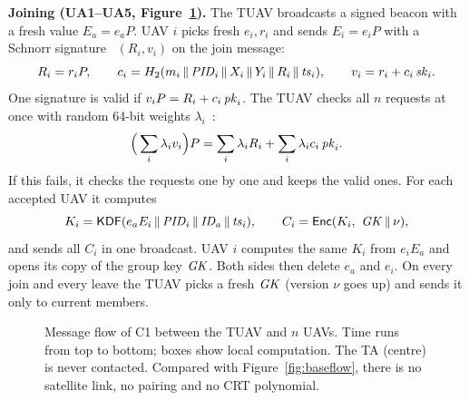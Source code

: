 \documentclass[11pt,openany]{report}
\begin{document}
\textbf{Joining (UA1--UA5, Figure~\ref{fig:c1flow}).} The TUAV broadcasts a signed beacon with a fresh value $E_a=e_aP$. UAV $i$ picks fresh $e_i,r_i$
and sends $E_i=e_iP$ with a Schnorr signature~\cite{schnorr} $(R_i,v_i)$ on the join message:
\[ R_i=r_iP,\qquad c_i=H_2(m_i\,\|\,\mathit{PID}_i\,\|\, X_i\,\|\, Y_i\,\|\, R_i\,\|\,\mathit{ts}_i),\qquad v_i=r_i+c_i\,\mathit{sk}_i . \]
One signature is valid if $v_iP=R_i+c_i\,\mathit{pk}_i$. The TUAV checks all $n$ requests at once with random 64-bit weights $\lambda_i$~\cite{bgr}:
\begin{equation}\label{eq:bv}
\Big(\sum_i\lambda_iv_i\Big)P=\sum_i\lambda_iR_i+\sum_i\lambda_ic_i\,\mathit{pk}_i .
\end{equation}
If this fails, it checks the requests one by one and keeps the valid ones. For each accepted UAV it computes
\[ K_i=\mathsf{KDF}(e_aE_i\,\|\,\mathit{PID}_i\,\|\,\mathit{ID}_a\,\|\,\mathit{ts}_i),\qquad C_i=\mathsf{Enc}(K_i,\ \mathit{GK}\,\|\,\nu), \]
and sends all $C_i$ in one broadcast. UAV $i$ computes the same $K_i$ from $e_iE_a$ and opens its copy of the group key $\mathit{GK}$. Both sides then delete
$e_a$ and $e_i$. On every join and every leave the TUAV picks a fresh $\mathit{GK}$ (version $\nu$ goes up) and sends it only to current members.

\begin{figure}[H]
\centering

\caption{Message flow of C1 between the TUAV and $n$ UAVs. Time runs from top to bottom; boxes show local computation. The TA (centre) is never
contacted. Compared with Figure~\ref{fig:baseflow}, there is no satellite link, no pairing and no CRT polynomial.}
\label{fig:c1flow}
\end{figure}
\end{document}
